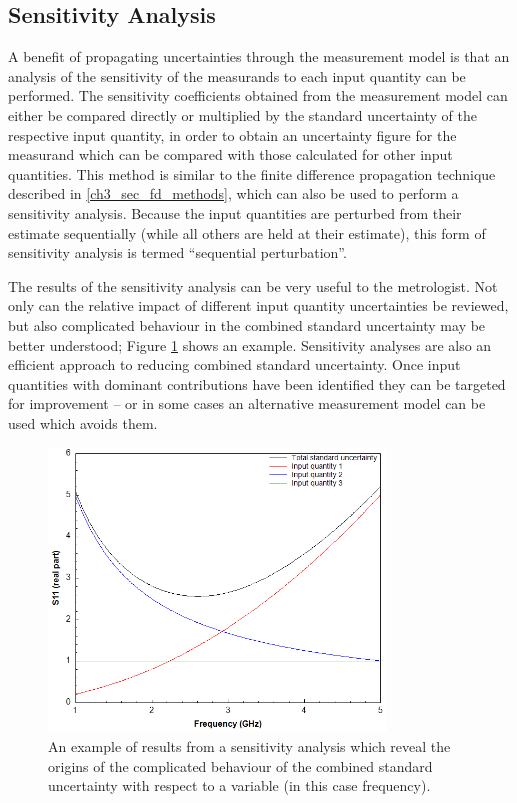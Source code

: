 \documentclass[../thesis/thesis.tex]{subfiles}
\begin{document}
\begin{refsection}
\section{Sensitivity Analysis}

A benefit of propagating uncertainties through the measurement model is that an analysis of the sensitivity of the measurands to each input quantity can be performed. The sensitivity coefficients obtained from the measurement model can either be compared directly or multiplied by the standard uncertainty of the respective input quantity, in order to obtain an uncertainty figure for the measurand which can be compared with those calculated for other input quantities. This method is similar to the finite difference propagation technique described in \ref{ch3_sec_fd_methods}, which can also be used to perform a sensitivity analysis. Because the input quantities are perturbed from their estimate sequentially (while all others are held at their estimate), this form of sensitivity analysis is termed ``sequential perturbation''.

The results of the sensitivity analysis can be very useful to the metrologist. Not only can the relative impact of different input quantity uncertainties be reviewed, but also complicated behaviour in the combined standard uncertainty may be better understood; Figure \ref{ch3_fig_sensitivity} shows an example. Sensitivity analyses are also an efficient approach to reducing combined standard uncertainty. Once input quantities with dominant contributions have been identified they can be targeted for improvement – or in some cases an alternative measurement model can be used which avoids them.

\begin{figure}[h!]
	\centering
	\includegraphics[width=0.8\textwidth]{sensitivity}
	\caption{An example of results from a sensitivity analysis which reveal the origins of the complicated behaviour of the combined standard uncertainty with respect to a variable (in this case frequency).}
	\label{ch3_fig_sensitivity}
\end{figure}


\end{refsection}
\end{document}
